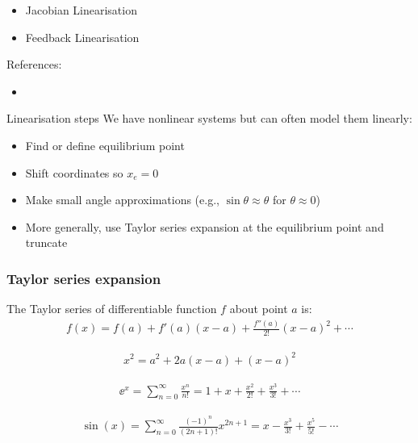 \documentclass{beamer-control}
\begin{document}

\begin{SUMMARY}
\begin{itemize}
\item Jacobian Linearisation
\item Feedback Linearisation
\end{itemize}
\vfill References:
\begin{itemize}
\item {}
\end{itemize}
\end{SUMMARY}




\begin{frame}{Linearisation steps}
We have nonlinear systems but can often model them linearly:
\begin{itemize}
\item Find or define equilibrium point
\item Shift coordinates so $x_e=0$
\item Make small angle approximations (e.g., $\sin\theta\approx\theta$ for $\theta\approx 0$)
\item More generally, use Taylor series expansion at the equilibrium point and truncate
\end{itemize}
\end{frame}

\begin{frame}
\frametitle{Taylor series expansion}
The Taylor series of differentiable function $f$ about point $a$ is:
\begin{align}
f(x) = f(a) + f'(a)(x - a) + \frac{f''(a)}{2!}(x - a)^2 + \cdots
\end{align}

\begin{align}
x^2 = a^2 + 2a(x - a) + (x - a)^2
\end{align}

\begin{align}
\ee^x = \sum_{n=0}^{\infty} \frac{x^n}{n!} = 1 + x + \frac{x^2}{2!} + \frac{x^3}{3!} + \cdots
\end{align}

\begin{align}
\sin(x) = \sum_{n=0}^{\infty} \frac{(-1)^n}{(2n+1)!} x^{2n+1} = x - \frac{x^3}{3!} + \frac{x^5}{5!} - \cdots
\end{align}
\end{frame}
\end{document}
